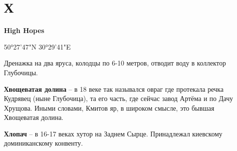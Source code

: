\chapter*{Х}

\textbf{High Hopes} 

50°27'47"N 30°29'41"E

Дренажка на два яруса, колодцы по 6-10 метров, отводит воду в коллектор Глубочицы.\\

\medskip


\textbf{Хвощеватая долина} – в 18 веке так назывался овраг где протекала речка Кудрявец (ныне Глубочица), та его часть, где сейчас завод Артёма и по Дачу Хрущова. Иными словами, Кмитов яр, в широком смысле, это бывшая Хвощеватая долина.\\

\medskip

\textbf{Хлопач} – в 16-17 веках хутор на Заднем Сырце. Принадлежал киевскому доминиканскому конвенту.